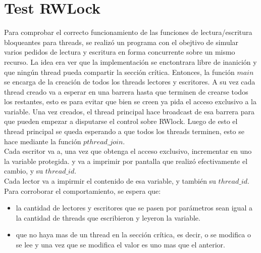 \section{Test RWLock}
Para comprobar el correcto funcionamiento de las funciones de lectura/escritura bloqueantes para threads, se realizó un programa con el
obejtivo de simular varios pedidos de lectura y escritura en forma concurrente sobre un mismo recurso.
La idea era ver que la implementación se enctontrara libre de inanición y que ningún thread pueda compartir la sección crítica.
Entonces, la función $main$ se encarga de la creación de todos los threads lectores y escritores. A su vez cada thread creado va a esperar en una barrera
hasta que terminen de crearse todos los restantes, esto es para evitar que bien se creen ya pida el acceso exclusivo a la variable.
Una vez creados, el thread principal hace broadcast de esa barrera para que pueden empezar a disputarse el control sobre RWlock. 
Luego de esto el thread principal se queda esperando a que todos los threads terminen, esto se hace mediante la función $pthread\_join$.
\\
Cada escritor va a, una vez que obtenga el acceso exclusivo, incrementar en uno la variable protegida. y va a imprimir por pantalla que realizó efectivamente
el cambio, y su $thread\_id$.
\\
Cada lector va a impirmir el contenido de esa variable, y también su $thread\_id$.
\\
Para corroborar el comportamiento, se espera que:
\begin{itemize}
\item{la cantidad de lectores y escritores que se pasen por parámetros sean igual a la cantidad de threads que escribieron y leyeron la variable.}
\item{que no haya mas de un thread en la sección crítica, es decir, o se modifica o se lee y una vez que se modifica el valor es uno mas que el anterior.}
\end{itemize}
